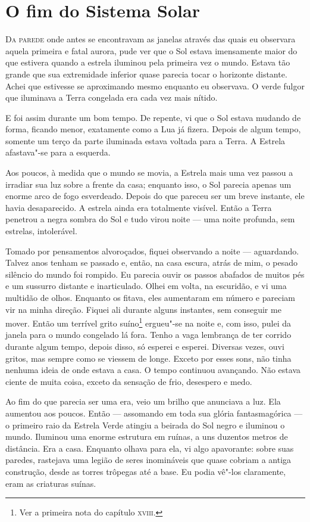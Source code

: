 \clearpage

\chapter{O fim do Sistema Solar}

\textsc{Da parede} onde antes se encontravam as janelas através das quais eu observara aquela primeira e fatal aurora, pude ver
que o Sol estava imensamente maior do que estivera quando a estrela iluminou pela primeira vez o mundo. Estava tão
grande que sua extremidade inferior quase parecia tocar o horizonte distante. Achei que estivesse se aproximando mesmo
enquanto eu observava. O verde fulgor que iluminava a Terra congelada era cada vez mais nítido.

E foi assim durante um bom tempo. De repente, vi que o Sol estava mudando de forma, ficando menor, exatamente como a
Lua já fizera. Depois de algum tempo, somente um terço da parte iluminada estava voltada para a Terra. A
Estrela afastava"-se para a esquerda.

Aos poucos, à medida que o mundo se movia, a Estrela mais uma vez passou a irradiar sua luz sobre a frente da casa;
enquanto isso, o Sol parecia apenas um enorme arco de fogo esverdeado. Depois do que pareceu ser um breve instante, ele
havia desaparecido. A estrela ainda era totalmente visível. Então a Terra penetrou a negra sombra do Sol e tudo virou
noite --- uma noite profunda, sem estrelas, intolerável.

Tomado por pensamentos alvoroçados, fiquei observando a noite --- aguardando. Talvez anos tenham se passado e, então, na
casa escura, atrás de mim, o pesado silêncio do mundo foi rompido. Eu parecia ouvir os passos abafados de muitos pés e
um sussurro distante e inarticulado. Olhei em volta, na escuridão, e vi uma multidão de olhos. Enquanto os fitava, eles
aumentaram em número e pareciam vir na minha direção. Fiquei ali durante alguns instantes, sem conseguir me
mover. Então um terrível grito suíno\footnote{ Ver a primeira nota do
capítulo \textsc{xviii}.} ergueu"-se na noite e, com isso, pulei da janela para o mundo congelado lá
fora. Tenho a vaga lembrança de ter corrido durante algum tempo, depois disso, só esperei e esperei. Diversas vezes,
ouvi gritos, mas sempre como se viessem de longe. Exceto por esses sons, não tinha nenhuma ideia de onde estava a casa.
O tempo continuou avançando. Não estava ciente de muita coisa, exceto da sensação de frio, desespero e medo.

Ao fim do que parecia ser uma era, veio um brilho que anunciava a luz. Ela aumentou aos poucos. Então --- assomando em
toda sua glória fantasmagórica --- o primeiro raio da Estrela Verde atingiu a beirada do Sol negro e iluminou o mundo.
Iluminou uma enorme estrutura em ruínas, a uns duzentos metros de distância. Era a casa. Enquanto olhava para ela, vi
algo apavorante: sobre suas paredes, rastejava uma legião de seres inomináveis que quase cobriam a antiga construção,
desde as torres trôpegas até a base. Eu podia vê"-los claramente, eram as criaturas suínas.

